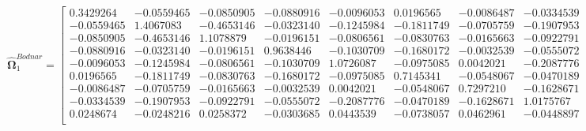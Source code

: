 \documentclass{article}\usepackage[]{graphicx}\usepackage[]{xcolor}
\def\bs{\boldsymbol}
\begin{document}
 \[
 \widehat{\bs{\Omega}}_{1}^{Bodnar} = 
 
  \begin{bmatrix}
 
 
 
 0.3429264 & -0.0559465 & -0.0850905 & -0.0880916 & -0.0096053 & 0.0196565 & -0.0086487 & -0.0334539 & 0.0248674\\
 
 -0.0559465 & 1.4067083 & -0.4653146 & -0.0323140 & -0.1245984 & -0.1811749 & -0.0705759 & -0.1907953 & -0.0248216\\
 
 -0.0850905 & -0.4653146 & 1.1078879 & -0.0196151 & -0.0806561 & -0.0830763 & -0.0165663 & -0.0922791 & 0.0258372\\
 
 -0.0880916 & -0.0323140 & -0.0196151 & 0.9638446 & -0.1030709 & -0.1680172 & -0.0032539 & -0.0555072 & -0.0303685\\
 
 -0.0096053 & -0.1245984 & -0.0806561 & -0.1030709 & 1.0726087 & -0.0975085 & 0.0042021 & -0.2087776 & 0.0443539\\
 
 0.0196565 & -0.1811749 & -0.0830763 & -0.1680172 & -0.0975085 & 0.7145341 & -0.0548067 & -0.0470189 & -0.0738057\\
 
 -0.0086487 & -0.0705759 & -0.0165663 & -0.0032539 & 0.0042021 & -0.0548067 & 0.7297210 & -0.1628671 & 0.0462961\\
 
 -0.0334539 & -0.1907953 & -0.0922791 & -0.0555072 & -0.2087776 & -0.0470189 & -0.1628671 & 1.0175767 & -0.0448897\\
 
 0.0248674 & -0.0248216 & 0.0258372 & -0.0303685 & 0.0443539 & -0.0738057 & 0.0462961 & -0.0448897 & 1.6962418\\
 
 
 \end{bmatrix}
 \]
 
\end{document}
